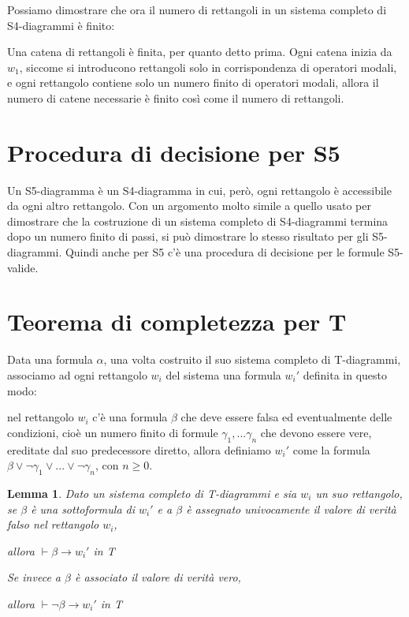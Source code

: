 \documentclass[a4paper, titlepage, 12pt]{report}
\newtheorem{lemma}{Lemma}[chapter]
\begin{document}
Possiamo dimostrare che ora il numero di rettangoli in un sistema
completo di S4-diagrammi è finito:

Una catena di rettangoli è finita, per quanto detto prima.
Ogni catena inizia da $w_1$, siccome si introducono rettangoli
solo in corrispondenza di operatori modali, e ogni rettangolo contiene solo un numero finito
di operatori modali, allora il numero di catene necessarie è finito
così come il numero di rettangoli.

\section{Procedura di decisione per S5}
Un S5-diagramma è un S4-diagramma in cui, però, ogni rettangolo è accessibile
da ogni altro rettangolo. Con un argomento molto simile a quello usato
per dimostrare che la costruzione di un sistema completo di S4-diagrammi termina dopo
un numero finito di passi, si può dimostrare lo stesso risultato per gli S5-diagrammi.
Quindi anche per S5 c'è una procedura di decisione per le formule S5-valide.


\section{Teorema di completezza per T}
Data una formula $\alpha$, una volta costruito il suo sistema completo di T-diagrammi,
associamo ad ogni rettangolo $w_i$ del sistema una formula $w_i'$ definita in questo modo:

nel rettangolo $w_i$ c'è una formula $\beta$ che deve essere falsa ed eventualmente delle condizioni,
cioè un numero finito di formule $\gamma_1, ...\gamma_n$ che devono essere vere, ereditate
dal suo predecessore diretto, allora definiamo $w_i'$ come la formula
$\beta \lor \neg \gamma_1 \lor ... \lor \neg \gamma_n$, con $n \geq 0$.

\begin{lemma} \label{LemmaImportante}
Dato un sistema completo di T-diagrammi e sia $w_i$ un suo rettangolo,
se $\beta$ è una sottoformula di $w_i'$ e a $\beta$ è assegnato univocamente il valore di verità falso
nel rettangolo $w_i$,

allora $\vdash \beta \rightarrow w_i'$ in T

Se invece a $\beta$ è associato il valore di verità vero,


allora $\vdash \neg \beta \rightarrow w_i'$ in T
\end{lemma}
\end{document}

